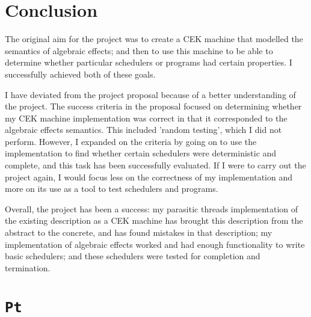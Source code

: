 \documentclass[12pt,a4paper,twoside,openright]{report}
\begin{document}
\chapter{Conclusion}

The original aim for the project was to create a CEK machine that modelled the semantics of algebraic effects; and then to use this machine to be able to determine whether particular schedulers or programs had certain properties. I successfully achieved both of these goals.

I have deviated from the project proposal because of a better understanding of the project. The success criteria in the proposal focused on determining whether my CEK machine implementation was correct in that it corresponded to the algebraic effects semantics. This included 'random testing', which I did not perform. However, I expanded on the criteria by going on to use the implementation to find whether certain schedulers were deterministic and complete, and this task has been successfully evaluated. If I were to carry out the project again, I would focus less on the correctness of my implementation and more on its use as a tool to test schedulers and programs.

Overall, the project has been a success: my parasitic threads implementation of the existing description as a CEK machine has brought this description from the abstract to the concrete, and has found mistakes in that description; my implementation of algebraic effects worked and had enough functionality to write basic schedulers; and these schedulers were tested for completion and termination.






\appendix
\chapter{\texttt{Pt}}\label{apppt}
\end{document}
